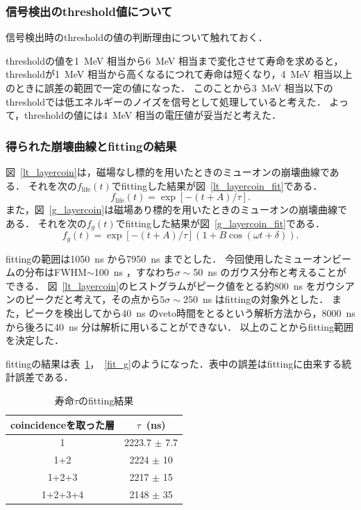   \subsubsection{信号検出のthreshold値について}
  信号検出時のthresholdの値の判断理由について触れておく．
  
  thresholdの値を1~MeV 相当から6~MeV 相当まで変化させて寿命を求めると，thresholdが1~MeV 相当から高くなるにつれて寿命は短くなり，4~MeV 相当以上のときに誤差の範囲で一定の値になった．
  このことから3~MeV 相当以下のthresholdでは低エネルギーのノイズを信号として処理していると考えた．
  よって，thresholdの値には4~MeV 相当の電圧値が妥当だと考えた．

  \subsubsection{得られた崩壊曲線とfittingの結果}
  図~\ref{lt_layercoin}は，磁場なし標的を用いたときのミューオンの崩壊曲線である．
  それを次の$f_{\mathrm{life}}(t)$でfittingした結果が図~\ref{lt_layercoin_fit}である．
  \begin{equation*}
   f_{\mathrm{life}}(t) = \exp[-(t+A)/\tau].
  \end{equation*}
  また，図~\ref{g_layercoin}は磁場あり標的を用いたときのミューオンの崩壊曲線である．
  それを次の$f_{g}(t)$でfittingした結果が図~\ref{g_layercoin_fit}である．
  \begin{equation*}
   f_{g}(t) = \exp[-(t+A)/\tau](1+B\cos(\omega t + \delta)).
  \end{equation*}
  
  fittingの範囲は1050~ns から7950~ns までとした． 
  今回使用したミューオンビームの分布はFWHM$\sim$100~ns ，すなわち$\sigma\sim$50~ns のガウス分布と考えることができる．
  図~\ref{lt_layercoin}のヒストグラムがピーク値をとる約800~ns をガウシアンのピークだと考えて，その点から$5\sigma\sim 250$~ns はfittingの対象外とした．
  また，ピークを検出してから40~ns のveto時間をとるという解析方法から，8000~ns から後ろに40~ns 分は解析に用いることができない．
  以上のことからfitting範囲を決定した．
  
  fittingの結果は表~\ref{fit_lt}，~\ref{fit_g}のようになった．表中の誤差はfittingに由来する統計誤差である．
  
  \begin{table}[H]
   \caption{寿命$\tau$のfitting結果}
   \label{fit_lt}
   \begin{center}
    \begin{tabular}{cc}\toprule
     coincidenceを取った層& $\tau$~(ns) \\ \midrule
     1 		        & 2223.7 $\pm$ 7.7 \\
     1+2 		& 2224 $\pm$ 10 \\
     1+2+3 		& 2217 $\pm$ 15 \\
     1+2+3+4 		& 2148 $\pm$ 35\\ \bottomrule
    \end{tabular}
   \end{center}
  \end{table}%
  

